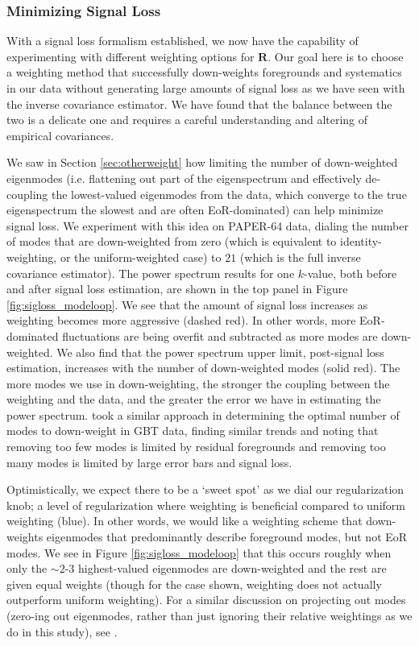 \documentclass[preprint2,numberedappendix,tighten]{aastex6}  %
\begin{document}
\subsubsection{Minimizing Signal Loss}
\label{sec:Weight}

With a signal loss formalism established, we now have the capability of experimenting 
with different weighting options for $\textbf{R}$. Our goal here is to choose a weighting method that successfully down-weights 
foregrounds and systematics in our data without generating large amounts of signal loss as we have seen with the inverse covariance estimator. We have found that the balance 
between the two is a delicate one and requires a careful understanding and altering of empirical covariances. 

We saw in Section \ref{sec:otherweight} how limiting the number of down-weighted eigenmodes (i.e. flattening out part of the 
eigenspectrum and effectively de-coupling the lowest-valued eigenmodes from the data, which converge to the true eigenspectrum the slowest and are often EoR-dominated) can help minimize signal loss. We experiment with this idea on PAPER-64 data, dialing the number of modes 
that are down-weighted from zero (which is equivalent to identity-weighting, or the uniform-weighted case) to $21$ (which is the full inverse 
covariance estimator). The power spectrum results for one $k$-value, both before and after signal loss 
estimation, are shown in the top panel in Figure \ref{fig:sigloss_modeloop}. We see that the amount of signal loss increases as weighting 
becomes more aggressive (dashed red). In other words, more EoR-dominated fluctuations are being overfit and 
subtracted as more modes are down-weighted. We also find that the power spectrum upper limit, post-signal loss estimation, 
increases with the number of down-weighted modes (solid red). The more modes we use in down-weighting, the stronger the coupling between the weighting and the data, and the greater the error we have in estimating the power spectrum. \citet{switzer_et_al2013} took a similar approach in determining the optimal number of modes to down-weight in GBT data, finding similar trends and noting that removing too few modes is limited by residual foregrounds and removing too many modes is limited by large error bars and signal loss.

Optimistically, we expect there to be a `sweet spot' as we dial our regularization knob; a level of regularization where weighting 
is beneficial compared to uniform weighting (blue). In other words, we would like a weighting scheme that down-weights eigenmodes that predominantly describe foreground modes, but not EoR modes. We see in Figure \ref{fig:sigloss_modeloop} that this occurs roughly when 
only the $\sim2$-$3$ highest-valued eigenmodes are down-weighted and the rest are given equal weights (though for the case shown, weighting does not actually outperform uniform weighting). For a similar discussion on projecting out modes (zero-ing out eigenmodes, rather than just ignoring their relative weightings as we do in this study), see \citet{switzer_et_al2013}. 
\end{document}
